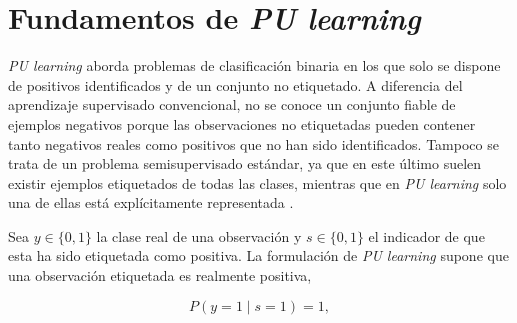\section{Fundamentos de \textit{PU learning}}\label{sec:fundamentos_pu}

    \textit{PU learning} aborda problemas de clasificación binaria en los que solo se dispone de positivos identificados y de un conjunto no etiquetado. A diferencia del aprendizaje supervisado convencional, no se conoce un conjunto fiable de ejemplos negativos porque las observaciones no etiquetadas pueden contener tanto negativos reales como positivos que no han sido identificados. Tampoco se trata de un problema semisupervisado estándar, ya que en este último suelen existir ejemplos etiquetados de todas las clases, mientras que en \textit{PU learning} solo una de ellas está explícitamente representada \cite{Elkan2008,Bekker2020}.

    Sea \(y\in\{0,1\}\) la clase real de una observación y \(s\in\{0,1\}\) el indicador de que esta ha sido etiquetada como positiva. La formulación de \textit{PU learning} supone que una observación etiquetada es realmente positiva,

    \[
    P(y=1\mid s=1)=1,
    \]

